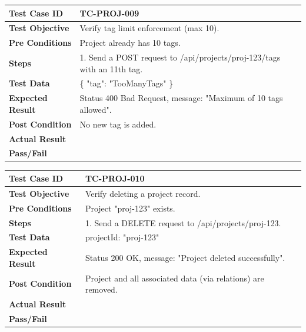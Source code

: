 \begin{longtable}{|p{}|p{}|}
\hline
\textbf{Test Case ID} & TC-PROJ-009 \\ \hline
\textbf{Test Objective} & Verify tag limit enforcement (max 10). \\ \hline
\textbf{Pre Conditions} & Project already has 10 tags. \\ \hline
\textbf{Steps} & 
1. Send a POST request to /api/projects/proj-123/tags with an 11th tag. \\ \hline
\textbf{Test Data} & \{ "tag": "TooManyTags" \} \\ \hline
\textbf{Expected Result} & Status 400 Bad Request, message: "Maximum of 10 tags allowed". \\ \hline
\textbf{Post Condition} & No new tag is added. \\ \hline
\textbf{Actual Result} &  \\ \hline
\textbf{Pass/Fail} &  \\ \hline
\end{longtable}

\begin{longtable}{|p{}|p{}|}
\hline
\textbf{Test Case ID} & TC-PROJ-010 \\ \hline
\textbf{Test Objective} & Verify deleting a project record. \\ \hline
\textbf{Pre Conditions} & Project "proj-123" exists. \\ \hline
\textbf{Steps} & 
1. Send a DELETE request to /api/projects/proj-123. \\ \hline
\textbf{Test Data} & projectId: "proj-123" \\ \hline
\textbf{Expected Result} & Status 200 OK, message: "Project deleted successfully". \\ \hline
\textbf{Post Condition} & Project and all associated data (via relations) are removed. \\ \hline
\textbf{Actual Result} &  \\ \hline
\textbf{Pass/Fail} &  \\ \hline
\end{longtable}